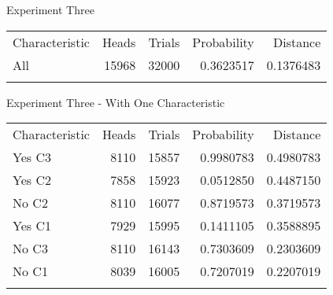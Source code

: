 \documentclass[
  ignorenonframetext,
]{beamer}
\renewcommand{\,}{\text{, }}
\begin{document}
\begin{frame}{Experiment Three}
\protect\hypertarget{experiment-three}{}
\begin{longtable}[]{@{}lrrrr@{}}
\toprule
Characteristic & Heads & Trials & Probability &
Distance \\ \addlinespace
\midrule
\endhead
All & 15968 & 32000 & 0.3623517 & 0.1376483 \\ \addlinespace
\bottomrule
\end{longtable}
\end{frame}

\begin{frame}{Experiment Three - With One Characteristic}
\protect\hypertarget{experiment-three---with-one-characteristic}{}
\begin{longtable}[]{@{}lrrrr@{}}
\toprule
Characteristic & Heads & Trials & Probability &
Distance \\ \addlinespace
\midrule
\endhead
Yes C3 & 8110 & 15857 & 0.9980783 & 0.4980783 \\ \addlinespace
Yes C2 & 7858 & 15923 & 0.0512850 & 0.4487150 \\ \addlinespace
No C2 & 8110 & 16077 & 0.8719573 & 0.3719573 \\ \addlinespace
Yes C1 & 7929 & 15995 & 0.1411105 & 0.3588895 \\ \addlinespace
No C3 & 8110 & 16143 & 0.7303609 & 0.2303609 \\ \addlinespace
No C1 & 8039 & 16005 & 0.7207019 & 0.2207019 \\ \addlinespace
\bottomrule
\end{longtable}
\end{frame}
\end{document}
